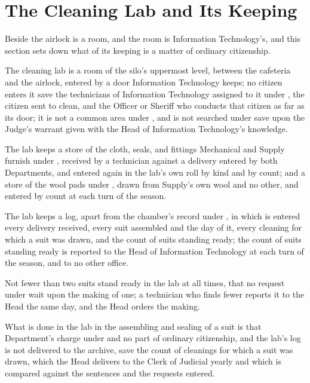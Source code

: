 \section{The Cleaning Lab and Its Keeping}
\label{sec:cleaning:cleaning-lab-and-its-keeping}

Beside the airlock is a room, and the room is Information Technology's, and this section sets down what of its keeping is a matter of ordinary citizenship.

\begin{clauses}
\item The cleaning lab is a room of the silo's uppermost level, between the cafeteria and the airlock, entered by a door Information Technology keeps; no citizen enters it save the technicians of Information Technology assigned to it under , the citizen sent to clean, and the Officer or Sheriff who conducts that citizen as far as its door; it is not a common area under , and is not searched under  save upon the Judge's warrant given with the Head of Information Technology's knowledge.
\item The lab keeps a store of the cloth, seals, and fittings Mechanical and Supply furnish under , received by a technician against a delivery entered by both Departments, and entered again in the lab's own roll by kind and by count; and a store of the wool pads under , drawn from Supply's own wool and no other, and entered by count at each turn of the season.
\item The lab keeps a log, apart from the chamber's record under , in which is entered every delivery received, every suit assembled and the day of it, every cleaning for which a suit was drawn, and the count of suits standing ready; the count of suits standing ready is reported to the Head of Information Technology at each turn of the season, and to no other office.
\item Not fewer than two suits stand ready in the lab at all times, that no request under  wait upon the making of one; a technician who finds fewer reports it to the Head the same day, and the Head orders the making.
\item What is done in the lab in the assembling and sealing of a suit is that Department's charge under  and no part of ordinary citizenship, and the lab's log is not delivered to the archive, save the count of cleanings for which a suit was drawn, which the Head delivers to the Clerk of Judicial yearly and which is compared against the sentences and the requests entered.
\end{clauses}


